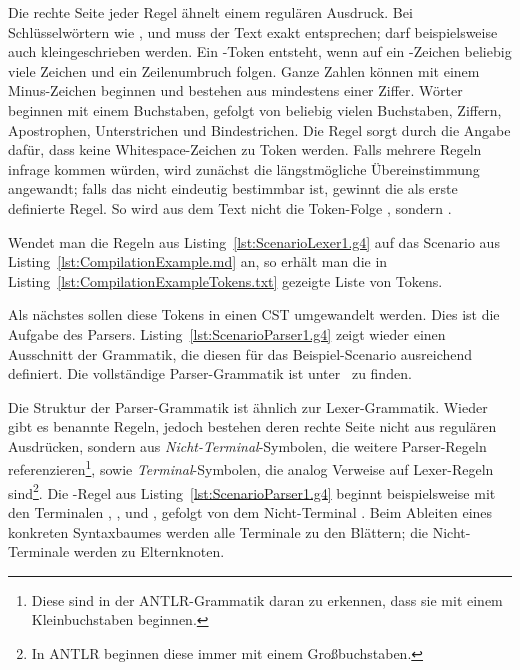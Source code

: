 Die rechte Seite jeder Regel ähnelt einem regulären Ausdruck.
Bei Schlüsselwörtern wie ,  und  muss der Text exakt entsprechen;
 darf beispielsweise auch kleingeschrieben werden.
Ein -Token entsteht, wenn auf ein \code{#}-Zeichen beliebig viele Zeichen und ein Zeilenumbruch folgen.
Ganze Zahlen können mit einem Minus-Zeichen beginnen und bestehen aus mindestens einer Ziffer.
Wörter beginnen mit einem Buchstaben, gefolgt von beliebig vielen Buchstaben, Ziffern, Apostrophen, Unterstrichen und Bindestrichen.
Die Regel  sorgt durch die Angabe  dafür, dass keine Whitespace-Zeichen zu Token werden.
Falls mehrere Regeln infrage kommen würden, wird zunächst die längstmögliche Übereinstimmung angewandt;
falls das nicht eindeutig bestimmbar ist, gewinnt die als erste definierte Regel.
So wird aus dem Text  nicht die Token-Folge , sondern .

Wendet man die Regeln aus Listing~\ref{lst:ScenarioLexer1.g4} auf das Scenario aus Listing~\ref{lst:CompilationExample.md} an,
so erhält man die in Listing~\ref{lst:CompilationExampleTokens.txt} gezeigte Liste von Tokens.


Als nächstes sollen diese Tokens in einen CST umgewandelt werden.
Dies ist die Aufgabe des Parsers.
Listing~\ref{lst:ScenarioParser1.g4} zeigt wieder einen Ausschnitt der Grammatik,
die diesen für das Beispiel-Scenario ausreichend definiert.
Die vollständige Parser-Grammatik ist unter~\cite{parser-grammar} zu finden.


Die Struktur der Parser-Grammatik ist ähnlich zur Lexer-Grammatik.
Wieder gibt es benannte Regeln, jedoch bestehen deren rechte Seite nicht aus regulären Ausdrücken,
sondern aus \emph{Nicht-Terminal}-Symbolen, die weitere Parser-Regeln referenzieren\footnote{Diese sind in der ANTLR-Grammatik daran zu erkennen, dass sie mit einem Kleinbuchstaben beginnen.},
sowie \emph{Terminal}-Symbolen, die analog Verweise auf Lexer-Regeln sind\footnote{In ANTLR beginnen diese immer mit einem Großbuchstaben.}.
Die -Regel aus Listing~\ref{lst:ScenarioParser1.g4} beginnt beispielsweise mit den Terminalen , ,  und , gefolgt von dem Nicht-Terminal .
Beim Ableiten eines konkreten Syntaxbaumes werden alle Terminale zu den Blättern;
die Nicht-Terminale werden zu Elternknoten.

